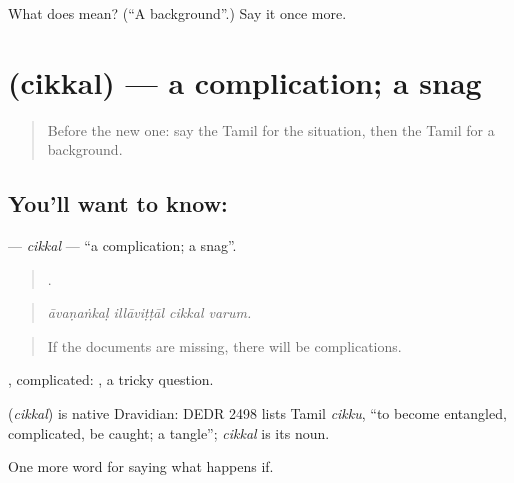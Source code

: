 \begin{tcolorbox}[breakable,colback=teal!4,colframe=teal!35!black,title={Before you move on}]
What does  mean? (\textquotedblleft{}A background\textquotedblright{}.) Say it once more.
\end{tcolorbox}
\section[\texorpdfstring{\ta{சிக்கல்} (cikkal)}{சிக்கல் (cikkal)}]{ (cikkal) — a complication; a snag}

\label{lesson:TA-C385-cikkal}



\begin{quote}
Before the new one: say the Tamil for the situation, then the Tamil for a background.
\end{quote}

\subsection*{You'll want to know: }
\textbf{} — \emph{cikkal} — \textquotedblleft{}a complication; a snag\textquotedblright{}.

\begin{quote}
   .
\end{quote}

\begin{quote}
\emph{āvaṇaṅkaḷ illāviṭṭāl cikkal varum.}
\end{quote}

\begin{quote}
If the documents are missing, there will be complications.
\end{quote}

, complicated:  , a tricky question.

\begin{cousinweb}
\textbf{} (\emph{cikkal}) is native Dravidian: DEDR 2498 lists Tamil \emph{cikku}, \textquotedblleft{}to become entangled, complicated, be caught; a tangle\textquotedblright{}; \emph{cikkal} is its noun.
\end{cousinweb}

\begin{grammarlens}[title={What you've built}]
One more word for saying what happens if.
\end{grammarlens}

